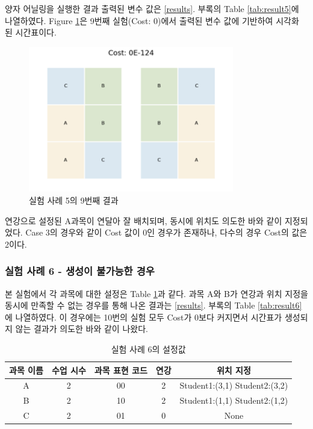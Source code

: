 \documentclass{article}
\begin{document}
양자 어닐링을 실행한 결과 출력된 변수 값은 \ref{results}. 부록의 Table \ref{tab:result5}에 나열하였다. Figure \ref{fig:case5}은 9번째 실험(Cost: 0)에서 출력된 변수 값에 기반하여 시각화 된 시간표이다.

    \begin{figure}[htb!]
        \centering
        \includegraphics[width=0.8\textwidth]{images/Case5.png}
        \caption{실험 사례 5의 9번째 결과}
        \label{fig:case5}
    \end{figure}

연강으로 설정된 A과목이 연달아 잘 배치되며, 동시에 위치도 의도한 바와 같이 지정되었다. Case 3의 경우와 같이 Cost 값이 0인 경우가 존재하나, 다수의 경우 Cost의 값은 2이다. 

    \subsubsection{실험 사례 6 - 생성이 불가능한 경우}

본 실험에서 각 과목에 대한 설정은 Table \ref{tab:testcase6}과 같다. 과목 A와 B가 연강과 위치 지정을 동시에 만족할 수 없는 경우를 통해 나온 결과는 \ref{results}. 부록의 Table \ref{tab:result6}에 나열하였다. 이 경우에는 10번의 실험 모두 Cost가 0보다 커지면서 시간표가 생성되지 않는 결과가 의도한 바와 같이 나왔다. 

    \begin{table}[htb!]
        \centering
        \begin{tabular}{c c c c c}
             \hline
             과목 이름 & 수업 시수 & 과목 표현 코드 & 연강 & 위치 지정\\
             \hline
             A & 2 & 00 & 2 & Student1:(3,1) Student2:(3,2)\\
             B & 2 & 10 & 2 & Student1:(1,1) Student2:(1,2)\\
             C & 2 & 01 & 0 & None\\
             \hline
        \end{tabular}
        \caption{실험 사례 6의 설정값}\label{tab:testcase6}
    \end{table}
\end{document}
